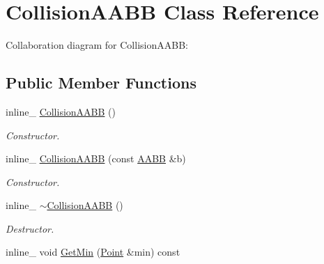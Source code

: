 \hypertarget{class_collision_a_a_b_b}{\section{Collision\+A\+A\+B\+B Class Reference}
\label{class_collision_a_a_b_b}
}


Collaboration diagram for Collision\+A\+A\+B\+B\+:
\subsection*{Public Member Functions}
\begin{DoxyCompactItemize}
\item 
\hypertarget{class_collision_a_a_b_b_af906906c07792fd4206d6acc58ebb514}{inline\+\_\+ \hyperlink{class_collision_a_a_b_b_af906906c07792fd4206d6acc58ebb514}{Collision\+A\+A\+B\+B} ()}\label{class_collision_a_a_b_b_af906906c07792fd4206d6acc58ebb514}

\begin{DoxyCompactList}\small\item\em Constructor. \end{DoxyCompactList}\item 
\hypertarget{class_collision_a_a_b_b_ada0c6c5a1c80b46156c965e56b752fbc}{inline\+\_\+ \hyperlink{class_collision_a_a_b_b_ada0c6c5a1c80b46156c965e56b752fbc}{Collision\+A\+A\+B\+B} (const \hyperlink{class_a_a_b_b}{A\+A\+B\+B} \&b)}\label{class_collision_a_a_b_b_ada0c6c5a1c80b46156c965e56b752fbc}

\begin{DoxyCompactList}\small\item\em Constructor. \end{DoxyCompactList}\item 
\hypertarget{class_collision_a_a_b_b_a61df95f9c6f7eccd172efaeadc780ba2}{inline\+\_\+ \hyperlink{class_collision_a_a_b_b_a61df95f9c6f7eccd172efaeadc780ba2}{$\sim$\+Collision\+A\+A\+B\+B} ()}\label{class_collision_a_a_b_b_a61df95f9c6f7eccd172efaeadc780ba2}

\begin{DoxyCompactList}\small\item\em Destructor. \end{DoxyCompactList}\item 
\hypertarget{class_collision_a_a_b_b_a5084b74e57fa1af3a24046393cc40927}{inline\+\_\+ void \hyperlink{class_collision_a_a_b_b_a5084b74e57fa1af3a24046393cc40927}{Get\+Min} (\hyperlink{class_point}{Point} \&min) const }\label{class_collision_a_a_b_b_a5084b74e57fa1af3a24046393cc40927}


\end{DoxyCompactItemize}
